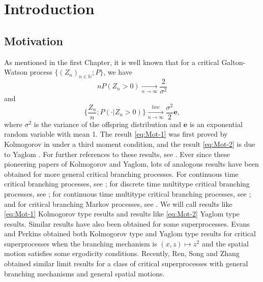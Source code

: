 \documentclass[UTF8]{pkuthss}
\theoremstyle{plain}
\theoremstyle{definition}
\numberwithin{equation}{section}
\begin{document}
\section{Introduction}
\subsection{Motivation}
\label{sec: Motivation}
	As mentioned in the first Chapter, it is well known that for a critical Galton-Watson process $\{(Z_n)_{n\in \mathbb N};P\}$, we have
\begin{equation}
\label{eq:Mot-1}
	nP(Z_n>0)
	\xrightarrow[n\to\infty]{} \frac{2}{\sigma^2}
\end{equation}
	and
\begin{equation}
\label{eq:Mot-2}
	\Big\{\frac{Z_n}{n}; P(\cdot|Z_n>0)\Big\}
	\xrightarrow[n\to\infty]{law} \frac{\sigma^2}{2} \mathbf e,
\end{equation}
	where $\sigma^2$ is the variance of the offspring distribution and $\mathbf e$ is an exponential random variable with mean 1.
	The result \eqref{eq:Mot-1} was first proved by Kolmogorov in \cite{Kolmogorov1938Zur-losung} under a third moment condition, and the result \eqref{eq:Mot-2} is due to Yaglom \cite{Yaglom1947Certain}.
	For further references to these results, see \cite{Harris2002The-theory, KestenNeySpitzer1966The-Galton-Watson}.
	Ever since these pioneering papers of Kolmogorov and Yaglom, lots of analogous results
	have been obtained for more general critical branching processes.
	For continuous time critical branching processes, see \cite{AthreyaNey1972Branching}; for discrete time multitype critical branching processes, see \cite{AthreyaNey1972Branching, JoffeSpitzer1967On-multitype}; for continuous time multitype critical branching processes, see \cite{AthreyaNey1974Functionals}; and for critical branching Markov processes, see \cite{AsmussenHering1983Branching}.
	We will call results like \eqref{eq:Mot-1} Kolmogorov type results and results like \eqref{eq:Mot-2} Yaglom type results.
	Similar results have also been obtained for some superprocesses.
	Evans and Perkins \cite{EvansPerkins1990Measure-valued} obtained both Kolmogorov type and Yaglom type results for critical superprocesses when the branching mechanism is $(x,z) \mapsto z^2$ and the spatial motion satisfies some ergodicity conditions.
	Recently, Ren, Song and Zhang \cite{RenSongZhang2015Limit} obtained similar limit results for a class of critical superprocesses with general branching mechanisms and general spatial motions.
\end{document}

